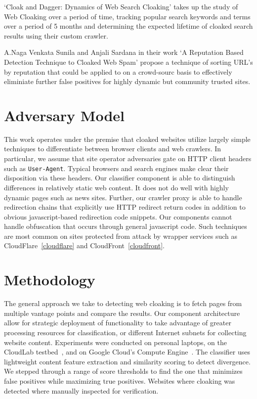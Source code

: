 \documentclass[letterpaper,twocolumn,10pt]{article}
\begin{document}
`Cloak and Dagger: Dynamics of Web Search Cloaking'\cite{Wang:2011:CDD:2046707.2046763} takes up the study of Web Cloaking over a period of time, tracking popular search keywords and terms over a period of 5 months and determining the expected lifetime of cloaked search results using their custom crawler.

A.Naga Venkata Sunila and Anjali Sardana in their work `A Reputation Based Detection Technique to Cloaked Web Spam'\cite{sunil2012reputation} propose a technique of sorting URL's by reputation that could be applied to on a crowd-sourc basis to effectively eliminiate further false positives for highly dynamic but community trusted sites.
\section{Adversary Model}

This work operates under the premise that cloaked websites utilize largely simple techniques to differentiate between browser clients and web crawlers. In particular, we assume that site operator adversaries gate on HTTP client headers such as \texttt{User-Agent}.  Typical browsers and search engines make clear their disposition via these headers.  Our classifier component is able to distinguish differences in relatively static web content.  It does not do well with highly dynamic pages such as news sites.  Further, our crawler proxy is able to handle redirection chains that explicitly use HTTP redirect return codes in addition to obvious javascript-based redirection code snippets.  Our components cannot handle obfuscation that occurs through general javascript code.  Such techniques are most common on sites protected from attack by wrapper services such as CloudFlare~\ref{cloudflare} and CloudFront~\ref{cloudfront}.

\section{Methodology}

The general approach we take to detecting web cloaking is to fetch pages from multiple vantage points and compare the results.  Our component architecture allow for strategic deployment of functionality to take advantage of greater processing resources for classification, or different Internet subnets for collecting website content. Experiments were conducted on personal laptops, on the CloudLab testbed~\cite{cloudlab}, and on Google Cloud's Compute Engine~\cite{gcloud}. The classifier uses lightweight content feature extraction and similarity scoring to detect divergence.  We stepped through a range of score thresholds to find the one that minimizes false positives while maximizing true positives.  Websites where cloaking was detected where manually inspected for verification.
\end{document}
